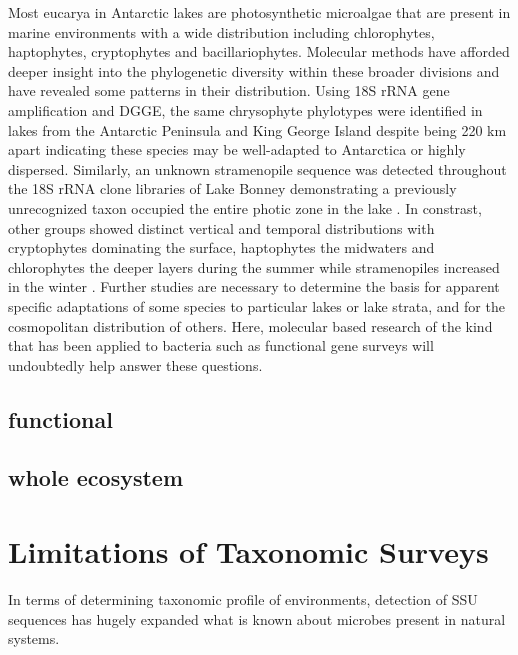Most eucarya in Antarctic lakes are photosynthetic microalgae that are present in marine environments with a wide distribution including chlorophytes, haptophytes, cryptophytes and bacillariophytes.
Molecular methods have afforded deeper insight into the phylogenetic diversity within these broader divisions and have revealed some patterns in their distribution. 
Using 18S rRNA gene amplification and DGGE, the same chrysophyte phylotypes were identified in lakes from the Antarctic Peninsula and King George Island 
despite being 220 km apart \cite{Unrein2005} indicating these species may be well-adapted to Antarctica or highly dispersed.
Similarly, an unknown stramenopile sequence was detected throughout the 18S rRNA clone libraries of Lake Bonney 
demonstrating a previously unrecognized taxon occupied the entire photic zone in the lake \cite{Bielewicz2011}. 
In constrast, other groups showed distinct vertical and temporal distributions with cryptophytes dominating the surface, 
haptophytes the midwaters and chlorophytes the deeper layers during the summer while stramenopiles increased in the winter \cite{Bielewicz2011}. 
Further studies are necessary to determine the basis for apparent specific adaptations of some species to particular lakes or lake strata, and for the cosmopolitan distribution of others.
Here, molecular based research of the kind that has been applied to bacteria such as functional gene surveys will undoubtedly help answer these questions.

\subsection{functional}

\subsection{whole ecosystem}


\section{Limitations of Taxonomic Surveys}
\label{in:pcrlimits}

In terms of determining taxonomic profile of environments, detection of SSU sequences has hugely expanded what is known about microbes present in natural systems.

